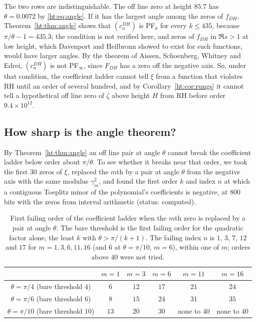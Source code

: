 The two rows are indistinguishable. The off line zero at height $85.7$ has $\theta=0.0072$ by \eqref{ht:eq:angle}. If it has the largest angle among the zeros of $f_{DH}$, Theorem~\ref{ht:thm:angle} shows that $(c_n^{DH})$ is PF$_k$ for every $k\le435$, because $\pi/\theta-1=435.3$; the condition is not verified here, and zeros of $f_{DH}$ in $\Re s>1$ at low height, which Davenport and Heilbronn showed to exist for such functions, would have larger angles. %
By the theorem of Aissen, Schoenberg, Whitney and Edrei, $(c_n^{DH})$ is not PF$_\infty$, since $F_{DH}$ has a zero off the negative axis. So, under that condition, the coefficient ladder cannot tell $\xi$ from a function that violates RH until an order of several hundred, and by Corollary~\ref{ht:cor:rungs} it cannot tell a hypothetical off line zero of $\zeta$ above height $H$ from RH before order $9.4\times10^{12}$.

\subsection{How sharp is the angle theorem?}\label{ht:sec:sharp}

By Theorem~\ref{ht:thm:angle} an off line pair at angle $\theta$ cannot break the coefficient ladder below order about $\pi/\theta$. To see whether it breaks near that order, we took the first $30$ zeros of $\xi$, replaced the $m$th by a pair at angle $\theta$ from the negative axis with the same modulus $\gamma_m^2$, and found the first order $k$ and index $n$ at which a contiguous Toeplitz minor of the polynomial's coefficients is negative, at $800$ bits with the zeros from interval arithmetic (status: computed).

\begin{table}[h]
\centering\footnotesize\setlength{\tabcolsep}{3pt}
\begin{tabular}{cccccc}
\toprule
 & $m=1$ & $m=3$ & $m=6$ & $m=11$ & $m=16$\\
\midrule
$\theta=\pi/4$ (bare threshold $4$) & $6$ & $12$ & $17$ & $21$ & $24$\\
$\theta=\pi/6$ (bare threshold $6$) & $8$ & $15$ & $24$ & $31$ & $35$\\
$\theta=\pi/10$ (bare threshold $10$) & $13$ & $20$ & $30$ & none to $40$ & none to $40$\\
\bottomrule
\end{tabular}
\caption{First failing order of the coefficient ladder when the $m$th zero is replaced by a pair at angle $\theta$. The bare threshold is the first failing order for the quadratic factor alone, the least $k$ with $\theta>\pi/(k+1)$. The failing index $n$ is $1$, $3$, $7$, $12$ and $17$ for $m=1,3,6,11,16$ (and $6$ at $\theta=\pi/10$, $m=6$), within one of $m$; orders above $40$ were not tried.}
\label{ht:tab:sharp}
\end{table}

